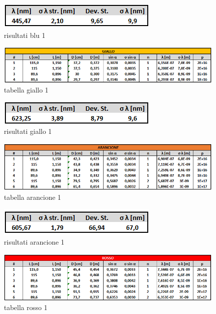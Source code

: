 \documentclass{article}
\begin{document}
\begin{figure}[h!]
  \centering
  \includegraphics[width=0.4\linewidth]{IM risultati blu 1}
  \caption{risultati blu 1}
\end{figure}

\begin{figure}[h!]
  \centering
  \includegraphics[width=1\linewidth]{IM tabella giallo 1}
  \caption{tabella giallo 1}
\end{figure}

\begin{figure}[h!]
  \centering
  \includegraphics[width=0.4\linewidth]{IM risultati giallo 1}
  \caption{risultati giallo 1}
\end{figure}

\begin{figure}[h!]
  \centering
  \includegraphics[width=1\linewidth]{IM tabella arancio 1}
  \caption{tabella arancione 1}
\end{figure}

\begin{figure}[h!]
  \centering
  \includegraphics[width=0.4\linewidth]{IM risultati arancio 1}
  \caption{risultati arancione 1}
\end{figure}

\begin{figure}[h!]
  \centering
  \includegraphics[width=1\linewidth]{IM tabella rosso 1}
  \caption{tabella rosso 1}
\end{figure}
\end{document}
